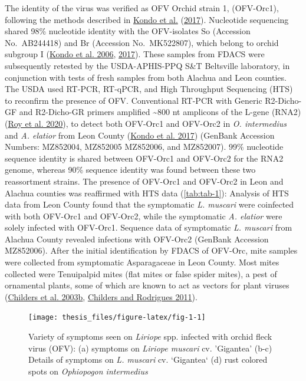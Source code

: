 \documentclass[12pt,final,CPage]{ufthesis}
\begin{document}
{  The identity of the virus was verified as OFV Orchid strain 1, (OFV-Orc1), following the methods described in \protect\hyperlink{ref-Kondo2017}{Kondo et al.} (\protect\hyperlink{ref-Kondo2017}{2017}). Nucleotide sequencing shared 98\% nucleotide identity with the OFV-isolates So (Accession No.~AB244418) and Br (Accession No.~MK522807), which belong to orchid subgroup I (\protect\hyperlink{ref-Kondo2006}{Kondo et al. 2006}, \protect\hyperlink{ref-Kondo2017}{2017}). These samples from FDACS were subsequently retested by the USDA-APHIS-PPQ S\&T Beltsville laboratory, in conjunction with tests of fresh samples from both Alachua and Leon counties. The USDA used RT-PCR, RT-qPCR, and High Throughput Sequencing (HTS) to reconfirm the presence of OFV. Conventional RT-PCR with Generic R2-Dicho-GF and R2-Dicho-GR primers amplified \textasciitilde800 nt amplicons of the L-gene (RNA2) (\protect\hyperlink{ref-Roy2020}{Roy et al. 2020}), to detect both OFV-Orc1 and OFV-Orc2 in \emph{O. intermedius} and \emph{A. elatior} from Leon County (\protect\hyperlink{ref-Kondo2017}{Kondo et al. 2017}) (GenBank Accession Numbers: MZ852004, MZ852005 MZ852006, and MZ852007). 99\% nucleotide sequence identity is shared between OFV-Orc1 and OFV-Orc2 for the RNA2 genome, whereas 90\% sequence identity was found between these two reassortment strains. The presence of OFV-Orc1 and OFV-Orc2 in Leon and Alachua counties was reaffirmed with HTS data (\ref{tab:tab-1}): Analysis of HTS data from Leon County found that the symptomatic \emph{L. muscari} were coinfected with both OFV-Orc1 and OFV-Orc2, while the symptomatic \emph{A. elatior} were solely infected with OFV-Orc1. Sequence data of symptomatic \emph{L. muscari} from Alachua County revealed infections with OFV-Orc2 (GenBank Accession MZ852006). After the initial identification by FDACS of OFV-Orc, mite samples were collected from symptomatic Asparagaceae in Leon County. Most mites collected were Tenuipalpid mites (flat mites or false spider mites), a pest of ornamental plants, some of which are known to act as vectors for plant viruses (\protect\hyperlink{ref-Childers2003}{Childers et al. 2003b}, \protect\hyperlink{ref-Childers2011}{Childers and Rodrigues 2011}).
  \begin{figure}

  {\centering \texttt{[image: thesis\_files/figure-latex/fig-1-1]} 

  }

  \caption{Variety of symptoms seen on \textit{Liriope} spp. infected with orchid fleck virus (OFV): (a) symptoms on \textit{Liriope muscari} cv. 'Gigantea' (b-c) Details of symptoms on \textit{L. muscari} cv. `Gigantea` (d) rust colored spots on \textit{Ophiopogon intermedius}}\label{fig:fig-1}
  \end{figure}
  \begin{figure}


\end{figure}}
\end{document}
